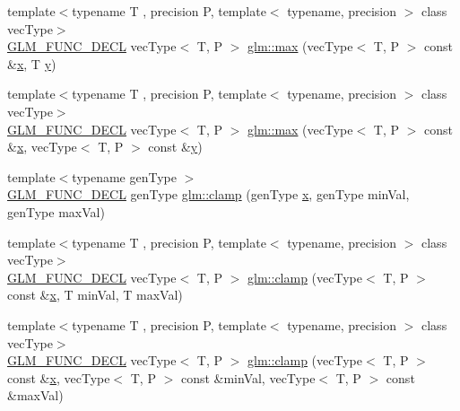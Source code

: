 \begin{DoxyCompactItemize}
\item 
{\footnotesize template$<$typename T , precision P, template$<$ typename, precision $>$ class vec\+Type$>$ }\\\mbox{\hyperlink{setup_8hpp_ab2d052de21a70539923e9bcbf6e83a51}{G\+L\+M\+\_\+\+F\+U\+N\+C\+\_\+\+D\+E\+CL}} vec\+Type$<$ T, P $>$ \mbox{\hyperlink{group__core__func__common_ga1a31d3f13a4bd0aa9828e263b7ac5896}{glm\+::max}} (vec\+Type$<$ T, P $>$ const \&\mbox{\hyperlink{glad_8h_a92d0386e5c19fb81ea88c9f99644ab1d}{x}}, T \mbox{\hyperlink{glad_8h_a66ddd433d2cacfe27f5906b7e86faeed}{y}})
\item 
{\footnotesize template$<$typename T , precision P, template$<$ typename, precision $>$ class vec\+Type$>$ }\\\mbox{\hyperlink{setup_8hpp_ab2d052de21a70539923e9bcbf6e83a51}{G\+L\+M\+\_\+\+F\+U\+N\+C\+\_\+\+D\+E\+CL}} vec\+Type$<$ T, P $>$ \mbox{\hyperlink{group__core__func__common_gad2ac6877ac7872a402ef5cae9bc6a30b}{glm\+::max}} (vec\+Type$<$ T, P $>$ const \&\mbox{\hyperlink{glad_8h_a92d0386e5c19fb81ea88c9f99644ab1d}{x}}, vec\+Type$<$ T, P $>$ const \&\mbox{\hyperlink{glad_8h_a66ddd433d2cacfe27f5906b7e86faeed}{y}})
\item 
{\footnotesize template$<$typename gen\+Type $>$ }\\\mbox{\hyperlink{setup_8hpp_ab2d052de21a70539923e9bcbf6e83a51}{G\+L\+M\+\_\+\+F\+U\+N\+C\+\_\+\+D\+E\+CL}} gen\+Type \mbox{\hyperlink{group__core__func__common_ga93bce26c7d80d30a62f5c508f8498a6c}{glm\+::clamp}} (gen\+Type \mbox{\hyperlink{glad_8h_a92d0386e5c19fb81ea88c9f99644ab1d}{x}}, gen\+Type min\+Val, gen\+Type max\+Val)
\item 
{\footnotesize template$<$typename T , precision P, template$<$ typename, precision $>$ class vec\+Type$>$ }\\\mbox{\hyperlink{setup_8hpp_ab2d052de21a70539923e9bcbf6e83a51}{G\+L\+M\+\_\+\+F\+U\+N\+C\+\_\+\+D\+E\+CL}} vec\+Type$<$ T, P $>$ \mbox{\hyperlink{group__core__func__common_gaf9deddb167a3055ca51cd9af3ce535f6}{glm\+::clamp}} (vec\+Type$<$ T, P $>$ const \&\mbox{\hyperlink{glad_8h_a92d0386e5c19fb81ea88c9f99644ab1d}{x}}, T min\+Val, T max\+Val)
\item 
{\footnotesize template$<$typename T , precision P, template$<$ typename, precision $>$ class vec\+Type$>$ }\\\mbox{\hyperlink{setup_8hpp_ab2d052de21a70539923e9bcbf6e83a51}{G\+L\+M\+\_\+\+F\+U\+N\+C\+\_\+\+D\+E\+CL}} vec\+Type$<$ T, P $>$ \mbox{\hyperlink{group__core__func__common_ga240b9ec68274f12a2c4b6debf8979d1c}{glm\+::clamp}} (vec\+Type$<$ T, P $>$ const \&\mbox{\hyperlink{glad_8h_a92d0386e5c19fb81ea88c9f99644ab1d}{x}}, vec\+Type$<$ T, P $>$ const \&min\+Val, vec\+Type$<$ T, P $>$ const \&max\+Val)

\end{DoxyCompactItemize}

